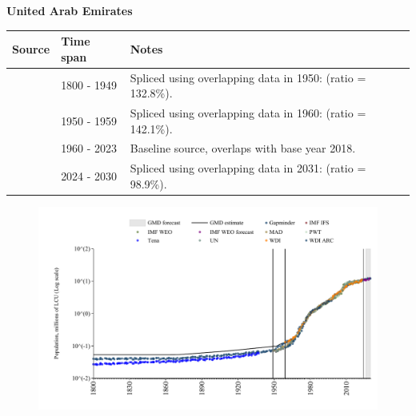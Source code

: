 \documentclass[12pt,a4paper,landscape]{article}
\begin{document}
\begin{adjustbox}{max totalsize={\paperwidth}{\paperheight},center}
\begin{minipage}[t][\textheight][t]{\textwidth}
\vspace*{0.5cm}
{}
\begin{center}
{\Large\bfseries United Arab Emirates}
\end{center}
\vspace{0.5cm}
\begin{table}[H]
\centering
\small
\begin{tabular}{|l|l|l|}
\hline
\textbf{Source} & \textbf{Time span} & \textbf{Notes} \\
\hline
\rowcolor{white}\cite{Gapminder}& 1800 - 1949 &Spliced using overlapping data in 1950: (ratio = 132.8\%).\\
\rowcolor{lightgray}\cite{IMF_IFS}& 1950 - 1959 &Spliced using overlapping data in 1960: (ratio = 142.1\%).\\
\rowcolor{white}\cite{WDI}& 1960 - 2023 &Baseline source, overlaps with base year 2018.\\
\rowcolor{lightgray}\cite{Gapminder}& 2024 - 2030 &Spliced using overlapping data in 2031: (ratio = 98.9\%).\\
\hline
\end{tabular}
\end{table}
\begin{figure}[H]
\centering
\includegraphics[width=\textwidth,height=0.6\textheight,keepaspectratio]{graphs/ARE_pop.pdf}
\end{figure}
\end{minipage}
\end{adjustbox}
\end{document}
